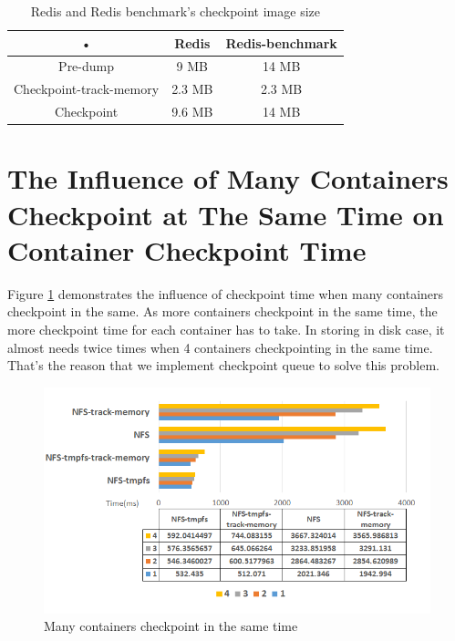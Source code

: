 \begin{table}[hbtp]
\begin{center}
\begin{tabular}{|c|c|c|}
\hline 
• & Redis & Redis-benchmark \\ 
\hline 
Pre-dump & 9 MB & 14 MB \\ 
\hline 
Checkpoint-track-memory & 2.3 MB & 2.3 MB \\ 
\hline 
Checkpoint & 9.6 MB & 14 MB \\ 
\hline 
\end{tabular}
\caption{Redis and Redis benchmark's checkpoint image size}
\label{table:redis image size}
\end{center}
\end{table}

\section{The Influence of Many Containers Checkpoint at The Same Time on Container Checkpoint Time}
Figure \ref{fig:many containers} demonstrates the influence of checkpoint time when many containers checkpoint in the same.
As more containers checkpoint in the same time, the more checkpoint time for each container has to take.
In storing in disk case, it almost needs twice times when 4 containers checkpointing in the same time. That's the reason that we implement checkpoint queue to solve this problem.

\begin{figure}[htbp]
\begin{center}
\includegraphics[width=14cm]{figure/many_containers.png}
\end{center}
\caption{Many containers checkpoint in the same time}
\label{fig:many containers}
\end{figure}

